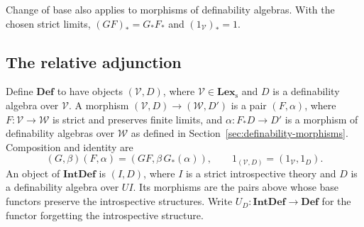 \documentclass[11pt]{article}
\theoremstyle{definition}
\theoremstyle{remark}
\begin{document}
Change of base also applies to morphisms of definability algebras.
With the chosen strict limits,
$(GF)_*=G_*F_*$ and $(1_{\mathscr V})_*=1$.

\subsection{The relative adjunction}
\label{sec:relative-introspective-adjunction}

Define $\mathbf{Def}$ to have objects $(\mathscr V,D)$, where
$\mathscr V\in\mathbf{Lex}_{\mathrm{s}}$ and $D$ is a definability
algebra over $\mathscr V$. A morphism
$(\mathscr V,D)\to(\mathscr W,D')$ is a pair $(F,\alpha)$,
where $F:\mathscr V\to\mathscr W$ is strict and preserves finite
limits, and $\alpha:F_*D\to D'$ is a morphism of definability
algebras over $\mathscr W$ as defined in Section~\ref{sec:definability-morphisms}.
Composition and identity are
\[
 (G,\beta)(F,\alpha)=(GF,\beta\,G_*(\alpha)),
 \qquad 1_{(\mathscr V,D)}=(1_{\mathscr V},1_D).
\]
An object of $\mathbf{IntDef}$ is $(I,D)$, where $I$ is a strict
introspective theory and $D$ is a definability algebra over $UI$.
Its morphisms are the pairs above whose base functors preserve
the introspective structures.
Write $U_D:\mathbf{IntDef}\to\mathbf{Def}$ for the functor
forgetting the introspective structure.
\end{document}
